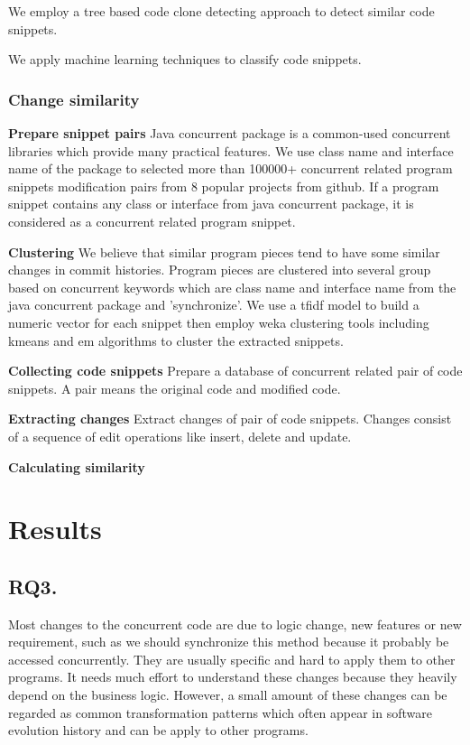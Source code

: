 \documentclass{sig-alternate-05-2015}
\begin{document}
We employ a tree based code clone detecting approach to detect similar code snippets.

We apply machine learning techniques to classify code snippets.
\subsubsection{Change similarity}

\textbf{Prepare snippet pairs}
Java concurrent package is a common-used concurrent libraries which provide many practical features. We use class name and interface name of the package to selected more than 100000+ concurrent related program snippets modification pairs from 8 popular projects from github. If a program snippet contains any class or interface from java concurrent package, it is considered as a concurrent related program snippet.

\textbf{Clustering}
We believe that similar program pieces tend to have some similar changes in commit histories. Program pieces are clustered into several group based on concurrent keywords which are class name and interface name from the java concurrent package and 'synchronize'. We use a tfidf model to build a numeric vector for each snippet then employ weka clustering tools including kmeans and em algorithms to cluster the extracted snippets.

\textbf{Collecting code snippets} Prepare a database of concurrent related pair of code snippets. A pair means the original code and modified code.

\textbf{Extracting changes} Extract changes of pair of code snippets. Changes consist of a sequence of edit operations like insert, delete and update.

\textbf{Calculating similarity} 

\section{Results}

\subsection{RQ3.}
Most changes to the concurrent code are due to logic change, new features or new requirement, such as we should synchronize this method because it probably be accessed concurrently. They are usually specific and hard to apply them to other programs. It needs much effort to understand these changes because they heavily depend on the business logic. However, a small amount of these changes can be regarded as common transformation patterns which often appear in software evolution history and can be apply to other programs.
\end{document}
